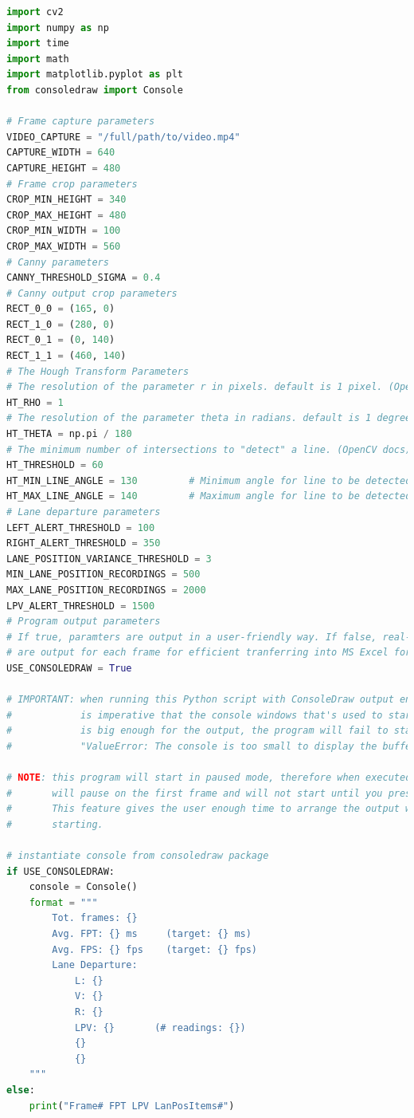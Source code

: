 \documentclass[10pt,conference]{IEEEtran}
\begin{document}
\begin{lstlisting}[language=Python,basicstyle=\tiny, showspaces=false, showstringspaces=false tabsize=1, breaklines=true]
import cv2
import numpy as np
import time
import math
import matplotlib.pyplot as plt
from consoledraw import Console

# Frame capture parameters
VIDEO_CAPTURE = "/full/path/to/video.mp4"
CAPTURE_WIDTH = 640
CAPTURE_HEIGHT = 480
# Frame crop parameters
CROP_MIN_HEIGHT = 340
CROP_MAX_HEIGHT = 480
CROP_MIN_WIDTH = 100
CROP_MAX_WIDTH = 560
# Canny parameters
CANNY_THRESHOLD_SIGMA = 0.4
# Canny output crop parameters
RECT_0_0 = (165, 0)
RECT_1_0 = (280, 0)
RECT_0_1 = (0, 140)
RECT_1_1 = (460, 140)
# The Hough Transform Parameters
# The resolution of the parameter r in pixels. default is 1 pixel. (OpenCV docs)
HT_RHO = 1
# The resolution of the parameter theta in radians. default is 1 degree. (OpenCV docs)
HT_THETA = np.pi / 180
# The minimum number of intersections to "detect" a line. (OpenCV docs)
HT_THRESHOLD = 60
HT_MIN_LINE_ANGLE = 130         # Minimum angle for line to be detected
HT_MAX_LINE_ANGLE = 140         # Maximum angle for line to be detected
# Lane departure parameters
LEFT_ALERT_THRESHOLD = 100
RIGHT_ALERT_THRESHOLD = 350
LANE_POSITION_VARIANCE_THRESHOLD = 3
MIN_LANE_POSITION_RECORDINGS = 500
MAX_LANE_POSITION_RECORDINGS = 2000
LPV_ALERT_THRESHOLD = 1500
# Program output parameters
# If true, paramters are output in a user-friendly way. If false, real-time metrics
# are output for each frame for efficient tranferring into MS Excel for processing
USE_CONSOLEDRAW = True

# IMPORTANT: when running this Python script with ConsoleDraw output enabled, it 
#            is imperative that the console windows that's used to start this script
#            is big enough for the output, the program will fail to start with an error:
#            "ValueError: The console is too small to display the buffer."

# NOTE: this program will start in paused mode, therefore when executed the video feed
#       will pause on the first frame and will not start until you press the 's' key.
#       This feature gives the user enough time to arrange the output windows before 
#       starting.

# instantiate console from consoledraw package
if USE_CONSOLEDRAW:
    console = Console()
    format = """
        Tot. frames: {}
        Avg. FPT: {} ms     (target: {} ms)
        Avg. FPS: {} fps    (target: {} fps)
        Lane Departure:
            L: {}
            V: {}
            R: {}
            LPV: {}       (# readings: {})
            {}
            {}
    """
else:
    print("Frame# FPT LPV LanPosItems#")


\end{lstlisting}
\end{document}
